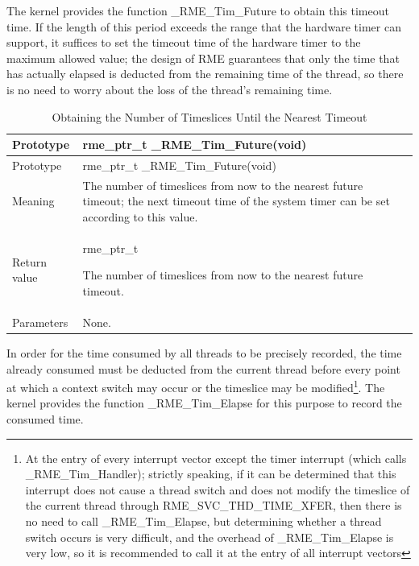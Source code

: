 The kernel provides the function \_RME\_Tim\_Future to obtain this timeout time. If the length of this period exceeds the range that the hardware timer can support, it suffices to set the timeout time of the hardware timer to the maximum allowed value; the design of RME guarantees that only the time that has actually elapsed is deducted from the remaining time of the thread, so there is no need to worry about the loss of the thread's remaining time.

\begin{xltabular}{\textwidth}{@{}>{\hsize\raggedright\arraybackslash}X>{\hsize\raggedright\arraybackslash}X@{}}
\caption{Obtaining the Number of Timeslices Until the Nearest Timeout}\label{tab:9-1-latest-timeout-slices}\\
\toprule
Prototype & rme\_ptr\_t \_RME\_Tim\_Future(void)\tabularnewline
\endfirsthead
\toprule
Prototype & rme\_ptr\_t \_RME\_Tim\_Future(void)\tabularnewline
\midrule
\endhead
\bottomrule
\endlastfoot
Meaning &
The number of timeslices from now to the nearest future timeout; the next timeout time of the system timer can be set according to this value.\tabularnewline
Return value\strut
 & rme\_ptr\_t

The number of timeslices from now to the nearest future timeout.\strut
\tabularnewline
Parameters & None.\tabularnewline
\end{xltabular}
\nopagebreak[4]

In order for the time consumed by all threads to be precisely recorded, the time already consumed must be deducted from the current thread before every point at which a context switch may occur or the timeslice may be modified\footnote{At the entry of every interrupt vector except the timer interrupt (which calls \_RME\_Tim\_Handler); strictly speaking, if it can be determined that this interrupt does not cause a thread switch and does not modify the timeslice of the current thread through RME\_SVC\_THD\_TIME\_XFER, then there is no need to call \_RME\_Tim\_Elapse, but determining whether a thread switch occurs is very difficult, and the overhead of \_RME\_Tim\_Elapse is very low, so it is recommended to call it at the entry of all interrupt vectors}. The kernel provides the function \_RME\_Tim\_Elapse for this purpose to record the consumed time.

